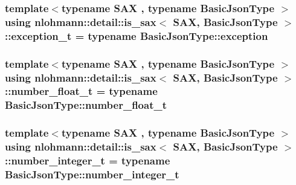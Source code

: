 \subsubsection[{\texorpdfstring{exception\+\_\+t}{exception_t}}]{\setlength{\rightskip}{0pt plus 5cm}template$<$typename S\+AX , typename Basic\+Json\+Type $>$ using {\bf nlohmann\+::detail\+::is\+\_\+sax}$<$ S\+AX, Basic\+Json\+Type $>$\+::{\bf exception\+\_\+t} =  typename Basic\+Json\+Type\+::exception\hspace{0.3cm}{\ttfamily [private]}}\hypertarget{structnlohmann_1_1detail_1_1is__sax_a6efa516f35d544cc8ce9a954f849fed1}{}\label{structnlohmann_1_1detail_1_1is__sax_a6efa516f35d544cc8ce9a954f849fed1}
\subsubsection[{\texorpdfstring{number\+\_\+float\+\_\+t}{number_float_t}}]{\setlength{\rightskip}{0pt plus 5cm}template$<$typename S\+AX , typename Basic\+Json\+Type $>$ using {\bf nlohmann\+::detail\+::is\+\_\+sax}$<$ S\+AX, Basic\+Json\+Type $>$\+::{\bf number\+\_\+float\+\_\+t} =  typename Basic\+Json\+Type\+::number\+\_\+float\+\_\+t\hspace{0.3cm}{\ttfamily [private]}}\hypertarget{structnlohmann_1_1detail_1_1is__sax_a58d3205c8d3c7a01cc330374fa7976c5}{}\label{structnlohmann_1_1detail_1_1is__sax_a58d3205c8d3c7a01cc330374fa7976c5}
\subsubsection[{\texorpdfstring{number\+\_\+integer\+\_\+t}{number_integer_t}}]{\setlength{\rightskip}{0pt plus 5cm}template$<$typename S\+AX , typename Basic\+Json\+Type $>$ using {\bf nlohmann\+::detail\+::is\+\_\+sax}$<$ S\+AX, Basic\+Json\+Type $>$\+::{\bf number\+\_\+integer\+\_\+t} =  typename Basic\+Json\+Type\+::number\+\_\+integer\+\_\+t\hspace{0.3cm}{\ttfamily [private]}}\hypertarget{structnlohmann_1_1detail_1_1is__sax_aa9a29390ca9810cee149510f586f5573}{}\label{structnlohmann_1_1detail_1_1is__sax_aa9a29390ca9810cee149510f586f5573}
